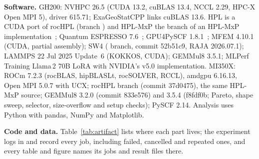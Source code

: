 \documentclass[conference]{IEEEtran}
\begin{document}
\textbf{Software.} GH200: NVHPC 26.5 (CUDA 13.2, cuBLAS 13.4, NCCL 2.29, HPC-X Open MPI 5), driver 615.71; ExaGeoStatCPP links
cuBLAS 13.6. HPL is a CUDA port of rocHPL (branch ) and HPL-MxP the 
branch of an HPL-MxP implementation~\cite{Dongarra2025}; Quantum ESPRESSO 7.6~\cite{Giannozzi2020}; GPU4PySCF
1.8.1~\cite{Wu2025,Li2025}; MFEM 4.10.1 (CUDA, partial assembly); SW4 ( branch, commit 52b51c9, RAJA
2026.07.1); LAMMPS 22 Jul 2025 Update~6 (KOKKOS, CUDA); GEMMul8 3.5.1; MLPerf Training Llama\,2 70B LoRA with NVIDIA's
v5.0 implementation. MI350X: ROCm 7.2.3 (rocBLAS, hipBLASLt, rocSOLVER, RCCL), amdgpu 6.16.13, Open MPI 5.0.7 with UCX;
rocHPL branch  (commit 37d0475), the same HPL-MxP source; GEMMul8 3.2.0 (commit
833e576) and 3.5.4 (f8fdf0b; Pareto, shape sweep, selector, size-overflow and setup checks); PySCF 2.14. Analysis uses Python with pandas, NumPy and Matplotlib.

\textbf{Code and data.} Table~\ref{tab:artifact} lists where each part lives; the experiment logs in  and
 record every job, including failed, cancelled and repeated ones, and every table and figure names its jobs
and result files there.
\end{document}

